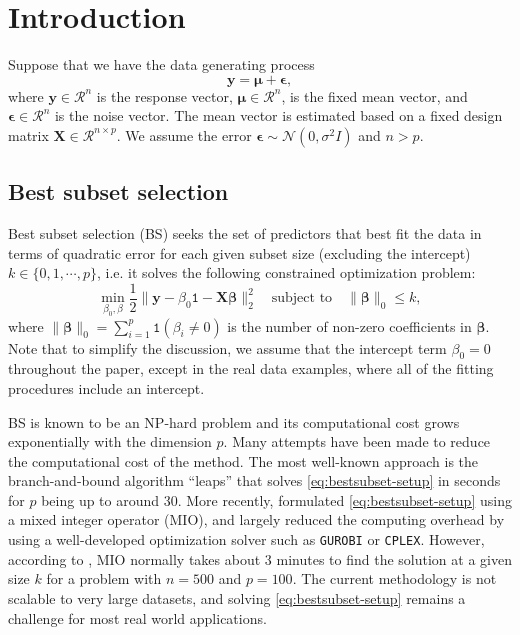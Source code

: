 \section{Introduction}
Suppose that we have the data generating process
\begin{equation}
\mathbf{y}=\mathbf{\mu}+\mathbf{\epsilon},
\label{eq:truemodel_def}
\end{equation}
where $\mathbf{y}\in \mathcal{R}^n$ is the response vector, $\mathbf{\mu} \in \mathcal{R}^n$, is the fixed mean vector, and $\mathbf{\epsilon} \in \mathcal{R}^n$ is the noise vector. The mean vector is estimated based on a fixed design matrix $\mathbf{X}\in \mathcal{R}^{n\times p}$. We assume the error $\mathbf{\epsilon} \sim \mathcal{N}(0,\sigma^2 I)$ and $n > p$.

\subsection{Best subset selection}
Best subset selection (BS) \citep{Hocking1967} seeks the set of predictors that best fit the data in terms of quadratic error for each given subset size (excluding the intercept) $k\in\{0,1,\cdots,p\}$, i.e. it solves the following constrained optimization problem:
\begin{equation}
\min_{\beta_0, \beta} \frac{1}{2} \lVert \mathbf{y}-\beta_0\mathtt{1} -\mathbf{X\beta}\rVert_2^2 \quad \text{subject to} \quad \lVert \mathbf{\beta} \rVert_0 \le k,
\label{eq:bestsubset-setup}
\end{equation}
where $\lVert \mathbf{\beta} \rVert_0 = \sum_{i=1}^{p} \mathtt{1}(\beta_i \ne 0)$ is the number of non-zero coefficients in $\mathbf{\beta}$. Note that to simplify the discussion, we assume that the intercept term $\beta_0=0$ throughout the paper, except in the real data examples, where all of the fitting procedures include an intercept.


BS is known to be an NP-hard problem \citep{Natarajan1995} and its computational cost grows exponentially with the dimension $p$. Many attempts have been made to reduce the computational cost of the method. The most well-known approach is the branch-and-bound algorithm ``leaps'' \citep{Furnival1974} that solves \eqref{eq:bestsubset-setup} in seconds for $p$ being up to around $30$. More recently, \citet{Bertsimas2016} formulated \eqref{eq:bestsubset-setup} using a mixed integer operator (MIO), and largely reduced the computing overhead by using a well-developed optimization solver such as {\tt GUROBI} or {\tt CPLEX}. However, according to \citet{Hastie2017}, MIO normally takes about $3$ minutes to find the solution at a given size $k$ for a problem with $n=500$ and $p=100$. The current methodology is not scalable to very large datasets, and solving \eqref{eq:bestsubset-setup} remains a challenge for most real world applications.

